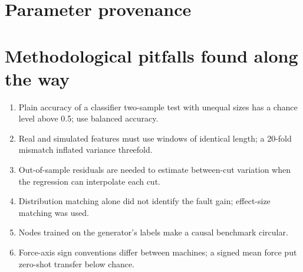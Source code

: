\documentclass[11pt]{article}
\begin{document}



\appendix
\section{Parameter provenance}\label{app:registry}
\begin{table}[h]\centering\small
\caption{Every simulator parameter, its tier (fixed / range / learned / assumed) and verification status.}

\end{table}

\section{Methodological pitfalls found along the way}
\begin{enumerate}
\item Plain accuracy of a classifier two-sample test with unequal sizes has a chance level above 0.5; use balanced accuracy.
\item Real and simulated features must use windows of identical length; a 20-fold mismatch inflated variance threefold.
\item Out-of-sample residuals are needed to estimate between-cut variation when the regression can interpolate each cut.
\item Distribution matching alone did not identify the fault gain; effect-size matching was used.
\item Nodes trained on the generator's labels make a causal benchmark circular.
\item Force-axis sign conventions differ between machines; a signed mean force put zero-shot transfer below chance.
\end{enumerate}
\end{document}
